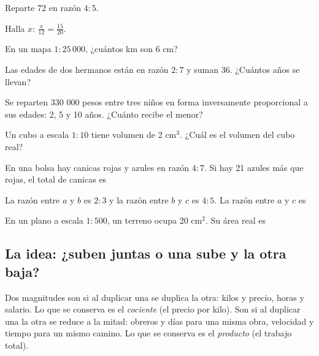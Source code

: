 \taller
{}
\begin{ejercicios}
\item Reparte 72 en razón $4 : 5$. 
\item Halla $x$: $\tfrac{x}{12} = \tfrac{15}{20}$. 
\item En un mapa $1 : 25\,000$, ¿cuántos km son 6 cm? 
\end{ejercicios}
\begin{ejercicios}
\item Las edades de dos hermanos están en razón $2 : 7$ y suman 36. ¿Cuántos años se llevan? 
\item Se reparten 330 000 pesos entre tres niños en forma inversamente proporcional a sus edades: 2, 5 y 10 años. ¿Cuánto recibe el menor? 
\item Un cubo a escala $1 : 10$ tiene volumen de 2 cm$^3$. ¿Cuál es el volumen del cubo real? 
\end{ejercicios}
\begin{ejercicios}
\item En una bolsa hay canicas rojas y azules en razón $4 : 7$. Si hay 21 azules más que rojas, el total de canicas es
\item La razón entre $a$ y $b$ es $2 : 3$ y la razón entre $b$ y $c$ es $4 : 5$. La razón entre $a$ y $c$ es
\item En un plano a escala $1 : 500$, un terreno ocupa 20 cm$^2$. Su área real es
\end{ejercicios}

\bitacora


\subsection{La idea: ¿suben juntas o una sube y la otra baja?}
Dos magnitudes son  si al duplicar una se duplica la otra: kilos y precio, horas y
salario. Lo que se conserva es el \emph{cociente} (el precio por kilo). Son  si al
duplicar una la otra se reduce a la mitad: obreros y días para una misma obra, velocidad y tiempo para un mismo camino.
Lo que se conserva es el \emph{producto} (el trabajo total).

